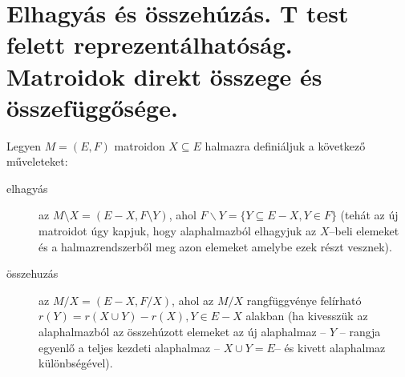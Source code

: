 \skiptooddpage \section[Elhagyás, összehúzás,
  összeg,reprezentálhatóság]{Elhagyás és összehúzás. T test felett reprezentálhatóság.
  Matroidok direkt összege és összefüggősége.}


Legyen $M=(E,F)$ matroidon $X \subseteq E$ halmazra definiáljuk a következő
műveleteket:
\begin{description}
	\item[elhagyás] az $M \setminus X=(E-X, F \setminus Y)$, ahol $F \backslash
		      Y=\{Y\subseteq E-X, Y \in F\}$ (tehát az új matroidot úgy kapjuk, hogy
	      alaphalmazból elhagyjuk az $X$--beli elemeket és a halmazrendszerből meg azon
	      elemeket amelybe ezek részt vesznek).
	\item[összehuzás]  az $M / X=(E-X, F / X)$, ahol az $M/X$ rangfüggvénye felírható
	      $r(Y)=r(X \cup Y) - r(X), Y \in  E-X$ alakban (ha kivesszük az alaphalmazból az
	      összehúzott elemeket az új alaphalmaz -- $Y$ -- rangja egyenlő a teljes kezdeti alaphalmaz
	      -- $X \cup Y = E$-- és kivett alaphalmaz különbségével).
\end{description}

